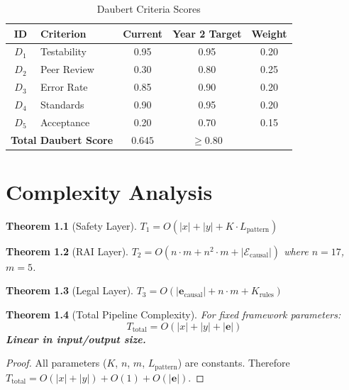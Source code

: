 \documentclass[12pt,a4paper]{report}
\theoremstyle{plain}
\newtheorem{theorem}{Theorem}[chapter]
\theoremstyle{definition}
\theoremstyle{remark}
\newcommand{\evidence}{\mathcal{E}}
\begin{document}
\begin{table}[htbp]
\centering
\caption{Daubert Criteria Scores}
\begin{tabular}{clccc}
\toprule
\textbf{ID} & \textbf{Criterion}
& \textbf{Current} & \textbf{Year 2 Target} & \textbf{Weight}\\
\midrule
$D_1$ & Testability & 0.95 & 0.95 & 0.20 \\
$D_2$ & Peer Review & 0.30 & 0.80 & 0.25 \\
$D_3$ & Error Rate  & 0.85 & 0.90 & 0.20 \\
$D_4$ & Standards   & 0.90 & 0.95 & 0.20 \\
$D_5$ & Acceptance  & 0.20 & 0.70 & 0.15 \\
\midrule
\multicolumn{2}{l}{\textbf{Total Daubert Score}}
& $\mathbf{0.645}$ & $\geq 0.80$ & \\
\bottomrule
\end{tabular}
\end{table}

\chapter{Complexity Analysis}
\label{ch:complexity}

\begin{theorem}[Safety Layer]
$T_1 = O(|x| + |y| + K \cdot L_{\text{pattern}})$
\end{theorem}

\begin{theorem}[RAI Layer]
$T_2 = O(n{\cdot}m + n^2{\cdot}m +
|\evidence_{\text{causal}}|)$
where $n{=}17$, $m{=}5$.
\end{theorem}

\begin{theorem}[Legal Layer]
$T_3 = O(|\mathbf{e}_{\text{causal}}| + n{\cdot}m
+ K_{\text{rules}})$
\end{theorem}

\begin{theorem}[Total Pipeline Complexity]
\label{thm:linear}
For fixed framework parameters:
\begin{equation}
    \boxed{T_{\text{total}} = O(|x| + |y| + |\mathbf{e}|)}
\end{equation}
\textbf{Linear in input/output size.}
\end{theorem}
\begin{proof}
All parameters ($K$, $n$, $m$, $L_{\text{pattern}}$)
are constants. Therefore $T_{\text{total}}
= O(|x|+|y|) + O(1) + O(|\mathbf{e}|)$.
\end{proof}
\end{document}

